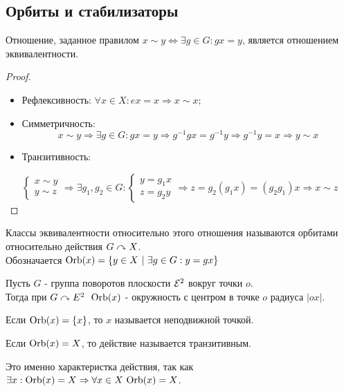 \subsection{Орбиты и стабилизаторы}
\begin{subtheorem}
    Отношение, заданное правилом $x \sim y \Longleftrightarrow \exists g \in G: gx = y$, является отношением эквивалентности.
\end{subtheorem}
\begin{proof}\tab
    \begin{itemize}
        \item Рефлексивность: $\forall x \in X: ex = x \Longrightarrow x \sim x$;
        \item Симметричность: 
        \[x \sim y \Longrightarrow \exists g \in G: gx = y \Longrightarrow g^{-1}gx = g^{-1}y \Longrightarrow g^{-1}y = x \Longrightarrow y \sim x\]
        \item Транзитивность:
    \end{itemize}
    \[\begin{cases} x \sim y \\ y \sim z \end{cases} \Longrightarrow \exists g_1, g_2 \in G: \begin{cases}y = g_1x \\ z = g_2y \end{cases} \Longrightarrow z = g_2(g_1x) = (g_2g_1)x \Longrightarrow x \sim z\]
\end{proof}
\begin{definition}
    Классы эквивалентности относительно этого отношения называются орбитами относительно действия $G \curvearrowright X$.\\
    Обозначается $\textup{Orb}(x) = \{y \in X \ | \ \exists g \in G: y = gx\}$
\end{definition}
\begin{example}
    Пусть $G$ - группа поворотов плоскости $\mathcal{E}^2$ вокруг точки $o$.\\
    Тогда при $G \acts E^2 \ \ \textup{Orb}(x)$ - окружность с центром в точке $o$ радиуса $|ox|$.
\end{example}
\begin{definition}
    Если $\textup{Orb}(x) = \{x\}$, то $x$ называется неподвижной точкой.
\end{definition}
\begin{definition}
    Если $\textup{Orb}(x) = X$, то действие называется транзитивным.
\end{definition}
\begin{remark}
    Это именно характеристка действия, так как $\exists x: \textup{Orb}(x) = X \Rightarrow \forall x \in X \ \textup{Orb}(x) = X$.
\end{remark}
